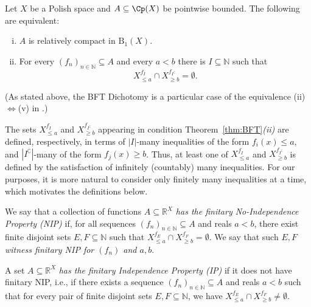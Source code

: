 \begin{theorem}
\label{thm:BFT}
    Let $X$ be a Polish space and $A\subseteq \Cp(X)$ be pointwise bounded.
    The following are equivalent:
    \begin{enumerate}[(i)]
        \item $A$ is relatively compact in $\mathrm{B}_1(X)$.
        \item For every $(f_n)_{n\in\mathbb{N}}\subseteq A$ and every $a<b$ there is $I\subseteq\mathbb{N}$ such that
        \begin{equation*}
            X_{\le a}^{f_I} \cap X_{\ge b}^{f_{I^{\complement}}} = \emptyset.
        \end{equation*}
    \end{enumerate}
\end{theorem}
(As stated above, the BFT Dichotomy is a particular case of the equivalence (ii)$\Leftrightarrow$(v) in {\cite[Corollary 4G]{BFT_1978_PCompactBaire}}.)

The sets $X_{\le a}^{f_I}$ and $X_{\ge b}^{f_{I^{\complement}}}$ appearing in condition Theorem~\ref{thm:BFT}\emph{(ii)} are defined, respectively, in terms of $|I|$-many inequalities of the form $f_i(x)\le a$, and $|I^{\complement}|$-many of the form $f_j(x)\ge b$.
Thus, at least one of $X_{\le a}^{f_I}$ and $X_{\ge b}^{f_{I^{\complement}}}$ is defined by the satisfaction of infinitely (countably) many inequalities.
For our purposes, it is more natural to consider only finitely many inequalities at a time, which motivates the definitions below.

\begin{definition}\label{def:NIP-fns}
    We say that a collection of functions \emph{$A\subseteq \mathbb{R}^X$ has the finitary No-Independence Property (NIP)} if, for all sequences $(f_n)_{n\in\mathbb{N}}\subseteq A$ and reals $a<b$, there exist finite disjoint sets $E,F\subseteq\mathbb{N}$ such that $X_{\le a}^{f_E} \cap X_{\ge b}^{f_F} = \emptyset$.
    We say that such $E, F$ \emph{witness finitary NIP for $(f_n)$ and $a, b$}.

    A set $A\subseteq \mathbb{R}^X$ \emph{has the finitary Independence Property (IP)} if it does not have finitary NIP, i.e., if there exists a sequence $(f_n)_{n\in\mathbb{N}}\subseteq A$ and reals $a<b$ such that for every pair of finite disjoint sets $E,F\subseteq\mathbb{N}$, we have $X_{\le a}^{f_E} \cap X_{\ge b}^{f_F} \ne \emptyset$.
\end{definition}

